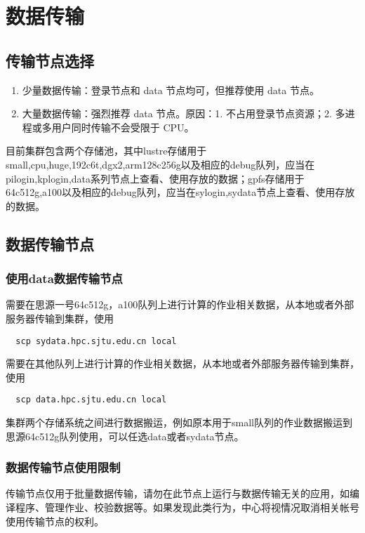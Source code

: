 \documentclass[cn, 12pt, hang, black, chinese]{elegantbook}
\begin{document}
\chapter{数据传输}

\section{传输节点选择}
\begin{enumerate}
\item 少量数据传输：登录节点和 data 节点均可，但推荐使用 data 节点。
\item 大量数据传输：强烈推荐 data 节点。原因：1. 不占用登录节点资源；2. 多进程或多用户同时传输不会受限于 CPU。
\end{enumerate}

    目前集群包含两个存储池，其中lustre存储用于small,cpu,huge,192c6t,dgx2,arm128c256g以及相应的debug队列，应当在pilogin,kplogin,data系列节点上查看、使用存放的数据；gpfs存储用于64c512g,a100以及相应的debug队列，应当在sylogin,sydata节点上查看、使用存放的数据。

\section{数据传输节点}

\subsection*{使用data数据传输节点}
需要在思源一号64c512g，a100队列上进行计算的作业相关数据，从本地或者外部服务器传输到集群，使用
\begin{lstlisting}
  scp sydata.hpc.sjtu.edu.cn local
\end{lstlisting}

    需要在其他队列上进行计算的作业相关数据，从本地或者外部服务器传输到集群，使用
\begin{lstlisting}
  scp data.hpc.sjtu.edu.cn local
\end{lstlisting}

    集群两个存储系统之间进行数据搬运，例如原本用于small队列的作业数据搬运到思源64c512g队列使用，可以任选data或者sydata节点。

\subsection*{数据传输节点使用限制}
传输节点仅用于批量数据传输，请勿在此节点上运行与数据传输无关的应用，如编译程序、管理作业、校验数据等。如果发现此类行为，中心将视情况取消相关帐号使用传输节点的权利。
\end{document}
